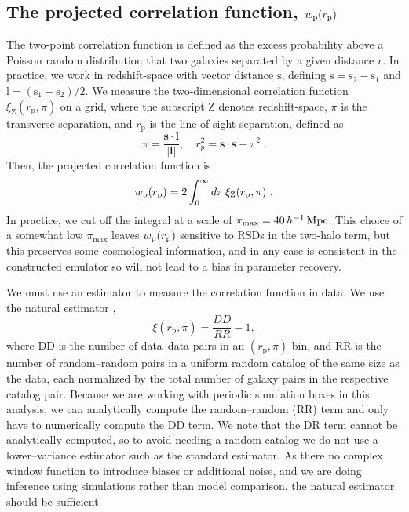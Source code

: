 \subsection{The projected correlation function, \texorpdfstring{$w_\mathrm{p}(r_\mathrm{p})$}{wp(rp)}}
\label{sec:wprp}

The two-point correlation function is defined as the excess probability above a Poisson random distribution that two galaxies separated by a given distance $r$.
In practice, we work in redshift-space with vector distance $\bm{\mathrm{s}}$, defining  $\bm{\mathrm{s}} = \bm{\mathrm{s}}_2 -  \bm{\mathrm{s}}_1$ and  $\bm{\mathrm{l}} = ( \bm{\mathrm{s}}_1 + \bm{\mathrm{s}}_2)/2$.
We measure the two-dimensional correlation function $\xi_\mathrm{Z}(r_\mathrm{p}, \pi)$ on a grid, where the subscript Z denotes redshift-space, $\pi$ is the transverse separation, and $r_\mathrm{p}$ is the line-of-sight separation, defined as
\begin{equation}
	\pi = \frac{\mathbf{s}\cdot\mathbf{l}}{|\mathbf{l}|}, 
	\quad r_{p}^2 =\mathbf{s}\cdot\mathbf{s}-\pi^2 ~.
\end{equation}
Then, the projected correlation function is
\begin{equation}
	w_\mathrm{p}(r_\mathrm{p}) = 2 \int_{0}^{\infty} d\pi \, \xi_\mathrm{Z}(r_\mathrm{p}, \pi) ~.
\end{equation}
In practice, we cut off the integral at a scale of $\pi_\mathrm{max} = 40 \, h^{-1}\,\mathrm{Mpc}$.
This choice of a somewhat low $\pi_\mathrm{max}$ leaves $w_\mathrm{p}(r_\mathrm{p})$ sensitive to RSDs in the two-halo term, but this preserves some cosmological information, and in any case is consistent in the constructed emulator so will not lead to a bias in parameter recovery.

We must use an estimator to measure the correlation function in data.
We use the natural estimator \citep{PeeblesHauser1974},
\begin{equation}
	\xi(r_\mathrm{p}, \pi) = \frac{DD}{RR} - 1,
\end{equation}
where DD is the number of data--data pairs in an $(r_\mathrm{p}, \pi)$ bin, and RR is the number of random--random pairs in a uniform random catalog of the same size as the data, each normalized by the total number of galaxy pairs in the respective catalog pair.
Because we are working with periodic simulation boxes in this analysis, we can analytically compute the random--random (RR) term and only have to numerically compute the DD term.
We note that the DR term cannot be analytically computed, so to avoid needing a random catalog we do not use a lower--variance estimator such as the standard \cite{LandySzalay1993} estimator.
As there no complex window function to introduce biases or additional noise, and we are doing inference using simulations rather than model comparison, the natural estimator should be sufficient.

